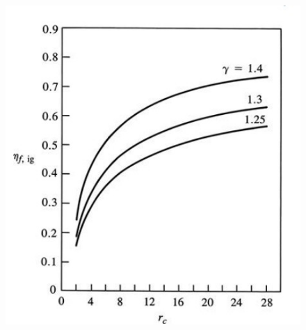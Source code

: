 \documentclass{article}
\begin{document}
\begin{multicols}{2}
		  
		\begin{figure}[H]
			\begin{center}
				\includegraphics[width=\columnwidth]{img/eff_vs_rc_with_gamma.jpeg}
			\end{center}
		\end{figure}
	\end{multicols}
	\pagebreak
\end{document}
